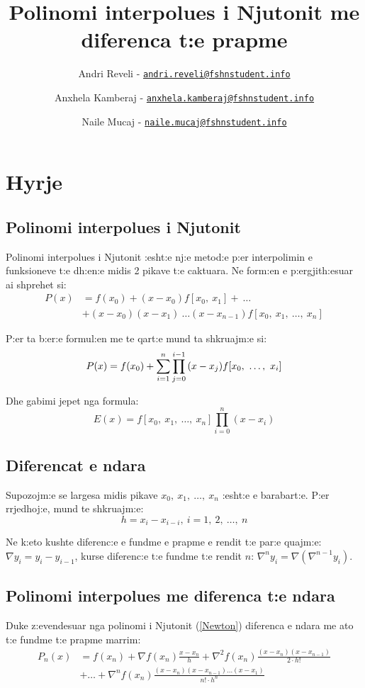 \documentclass[12pt, margin=1in, a4paper]{article}
\title{Polinomi interpolues i Njutonit me diferenca t:e prapme}
\author{
    Andri Reveli - \href{mailto:andri.reveli@fshnstudent.info}{\texttt{andri.reveli@fshnstudent.info}}
    \and
    Anxhela Kamberaj - \href{mailto:anxhela.kamberaj@fshnstudent.info}{\texttt{anxhela.kamberaj@fshnstudent.info}}
    \and
    Naile Mucaj - \href{mailto:naile.mucaj@fshnstudent.info}{\texttt{naile.mucaj@fshnstudent.info}}
    \and
}
\begin{document}
\maketitle
\tableofcontents

\newpage

\section{Hyrje}
  \subsection{Polinomi interpolues i Njutonit}
  Polinomi interpolues i Njutonit :esht:e nj:e metod:e p:er interpolimin e
  funksioneve t:e dh:en:e midis 2 pikave t:e caktuara. Ne form:en e p:ergjith:esuar ai
  shprehet si:
  \begin{align*}\label{Newton}
    P(x) &= f(x_0) + (x - x_0)f[x_0, \ x_1] + \ \dots \\
    &+ (x - x_0)(x - x_1) \ \dots (x - x_{n - 1})f[x_0, \ x_1, \ \dots, \ x_n]
  \end{align*}

  P:er ta b:er:e formul:en me te qart:e mund ta shkruajm:e si:
  \[
    P(x) = f(x_0) + \sum_{i = 1}^{n}{\prod_{j = 0}^{i - 1}{(x - x_j)}f[x_0, \ \dots, \ x_i]} \\
  \]

  Dhe gabimi jepet nga formula:
  \[
    E(x) = f[x_0, \ x_1, \ \dots, \ x_n]\prod_{i = 0}^n{(x - x_i)}
  \]

  \subsection{Diferencat e ndara}
  Supozojm:e se largesa midis pikave \(x_0, \ x_1, \ \dots, \ x_n\) :esht:e e
  barabart:e. P:er rrjedhoj:e, mund te shkruajm:e:
  \[
    h = x_i - x_{i - i}, \ i = 1, \ 2, \ \dots, \ n
  \]

  Ne k:eto kushte diferenc:e e fundme e prapme e rendit t:e par:e quajm:e:
  \(\nabla y_i = y_i - y_{i - 1}\), kurse diferenc:e t:e fundme t:e rendit \(n\):
  \(\nabla^ny_i = \nabla(\nabla^{n - 1}y_i)\).

  \subsection{Polinomi interpolues me diferenca t:e ndara}
  Duke z:evendesuar nga polinomi i Njutonit (\ref{Newton}) diferenca e ndara me
  ato t:e fundme t:e prapme marrim:
  \begin{align}
    P_n(x) &= f(x_n) + \nabla f(x_n)\frac{x - x_n}{h} + \nabla^2f(x_n)\frac{(x - x_n)(x - x_{n - 1})}{2 \cdot h!} \\
    &+ \dots + \nabla^n f(x_n)\frac{(x - x_n)(x - x_{n - 1}) \dots (x - x_1)}{n! \cdot h^n}
  \end{align}
\end{document}
